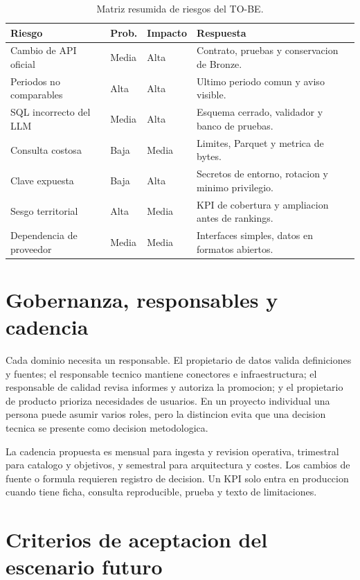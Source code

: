 \begin{longtable}{p{}p{}p{}p{}}
\caption{Matriz resumida de riesgos del TO-BE.}\label{tab:riesgos-tobe}\\
\toprule
\textbf{Riesgo} & \textbf{Prob.} & \textbf{Impacto} & \textbf{Respuesta} \\
\midrule
\endfirsthead
Cambio de API oficial & Media & Alta & Contrato, pruebas y conservacion de Bronze. \\
Periodos no comparables & Alta & Alta & Ultimo periodo comun y aviso visible. \\
SQL incorrecto del LLM & Media & Alta & Esquema cerrado, validador y banco de pruebas. \\
Consulta costosa & Baja & Media & Limites, Parquet y metrica de bytes. \\
Clave expuesta & Baja & Alta & Secretos de entorno, rotacion y minimo privilegio. \\
Sesgo territorial & Alta & Media & KPI de cobertura y ampliacion antes de rankings. \\
Dependencia de proveedor & Media & Media & Interfaces simples, datos en formatos abiertos. \\
\bottomrule
\end{longtable}

\section{Gobernanza, responsables y cadencia}

Cada dominio necesita un responsable. El propietario de datos valida definiciones y fuentes; el responsable tecnico mantiene conectores e infraestructura; el responsable de calidad revisa informes y autoriza la promocion; y el propietario de producto prioriza necesidades de usuarios. En un proyecto individual una persona puede asumir varios roles, pero la distincion evita que una decision tecnica se presente como decision metodologica.

La cadencia propuesta es mensual para ingesta y revision operativa, trimestral para catalogo y objetivos, y semestral para arquitectura y costes. Los cambios de fuente o formula requieren registro de decision. Un KPI solo entra en produccion cuando tiene ficha, consulta reproducible, prueba y texto de limitaciones.

\section{Criterios de aceptacion del escenario futuro}

